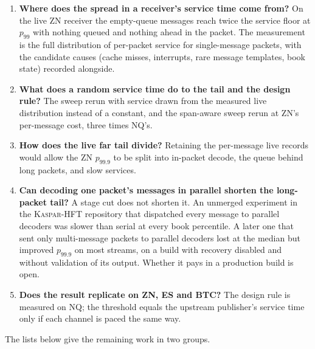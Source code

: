 \documentclass[11pt]{article}
\newcommand{\kasparhft}{\textsc{Kaspar-HFT}}
\begin{document}
\begin{enumerate}
{limit on information?} The conjecture of Section~\ref{sec:exchange-conjecture}.
    \item \textbf{Where does the spread in a receiver's service time come from?} On the
live ZN receiver the empty-queue messages reach twice the service floor at $p_{99}$ with nothing queued and
nothing ahead in the packet. The measurement is the full distribution of per-packet
service for single-message packets, with the candidate causes (cache misses, interrupts,
rare message templates, book state) recorded alongside.
    \item \textbf{What does a random service time do to the tail and the design rule?} The
sweep rerun with service drawn from the measured live distribution instead of a constant,
and the span-aware sweep rerun at ZN's per-message cost, three times NQ's.
    \item \textbf{How does the live far tail divide?} Retaining the per-message live
records would allow the ZN $p_{99.9}$ to be split into in-packet decode, the queue behind
long packets, and slow services.
    \item \textbf{Can decoding one packet's messages in parallel shorten the long-packet
tail?} A stage cut does not shorten it. An unmerged experiment in the \kasparhft{} repository that dispatched every message to
parallel decoders was slower than serial at every book percentile. A later one that sent
only multi-message packets to parallel decoders lost at the median but improved
$p_{99.9}$ on most streams, on a build with recovery disabled and without validation of
its output. Whether it pays in a
production build is open.
    \item \textbf{Does the result replicate on ZN, ES and BTC?} The design rule is measured
on NQ; the threshold equals the upstream publisher's service time only if each channel
is paced the same way.
\end{enumerate}

The lists below give the remaining work in two groups.
\end{document}
